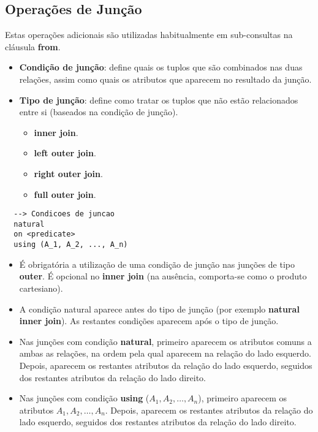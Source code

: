 \documentclass{article}
\begin{document}
\subsection{Operações de Junção}
Estas operações adicionais são utilizadas habitualmente em sub-consultas na cláusula \textbf{from}.
\begin{itemize}
  \item \textbf{Condição de junção}: define quais os tuplos que são combinados nas duas relações, assim como quais os atributos que aparecem no resultado da junção.
  \item \textbf{Tipo de junção}: define como tratar os tuplos que não estão relacionados entre si (baseados na condição de junção).
        \begin{itemize}
          \item \textbf{inner join}.
          \item \textbf{left outer join}.
          \item \textbf{right outer join}.
          \item \textbf{full outer join}.
        \end{itemize}
\end{itemize}

\begin{lstlisting}
  --> Condicoes de juncao
  natural
  on <predicate>
  using (A_1, A_2, ..., A_n)
\end{lstlisting}

\begin{itemize}
  \item É obrigatória a utilização de uma condição de junção nas junções de tipo \textbf{outer}. É opcional no \textbf{inner join} (na ausência, comporta-se como o produto cartesiano).
  \item A condição natural aparece antes do tipo de junção (por exemplo \textbf{natural inner join}). As restantes condições aparecem após o tipo de junção.
  \item Nas junções com condição \textbf{natural}, primeiro aparecem os atributos comuns a ambas as relações, na ordem pela qual aparecem na relação do lado esquerdo. Depois, aparecem os restantes atributos da relação do lado esquerdo, seguidos dos restantes atributos da relação do lado direito.
  \item Nas junções com condição \textbf{using} ($A_1, A_2,\dots , A_n$), primeiro aparecem os atributos $A_1, A_2,\dots , A_n$. Depois, aparecem os restantes atributos da relação do lado esquerdo, seguidos dos restantes atributos da relação do lado direito.
\end{itemize}
\end{document}
